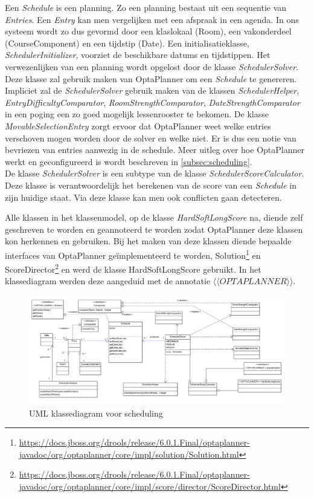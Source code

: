 Een \textit{Schedule} is een planning.
Zo een planning bestaat uit een sequentie van \textit{Entries}.
Een \textit{Entry} kan men vergelijken met een afspraak in een agenda.
In ons systeem wordt zo dus gevormd door een klaslokaal (Room), een vakonderdeel (CourseComponent) en een tijdstip (Date).
Een initialisatieklasse, \textit{SchedulerInitializer}, voorziet de beschikbare datums en tijdstippen.
Het verwezenlijken van een planning wordt opgelost door de klasse \textit{SchedulerSolver}.
Deze klasse zal gebruik maken van OptaPlanner om een \textit{ Schedule} te genereren.
Impliciet zal de \emph{SchedulerSolver} gebruik maken van de klassen \emph{SchedulerHelper}, \emph{EntryDifficultyComparator}, \emph{RoomStrengthComparator}, \emph{DateStrengthComparator} in een poging een zo goed mogelijk lessenrooster te bekomen.
De klasse \emph{MovableSelectionEntry} zorgt ervoor dat OptaPlanner weet welke entries verschoven mogen worden door de solver en welke niet.
Er is dus een notie van bevriezen van entries aanwezig in de schedule.
Meer uitleg over hoe OptaPlanner werkt en geconfigureerd is wordt beschreven in \ref{subsec:scheduling}.\\

De klasse \emph{SchedulerSolver} is een subtype van de klasse \emph{SchedulerScoreCalculator}.
Deze klasse is verantwoordelijk het berekenen van de score van een \emph{Schedule} in zijn huidige staat.
Via deze klasse kan men ook conflicten gaan detecteren.


Alle klassen in het klassenmodel, op de klasse \emph{HardSoftLongScore} na, diende zelf geschreven te worden en geannoteerd te worden zodat OptaPlanner deze klassen kon herkennen en gebruiken.
Bij het maken van deze klassen diende bepaalde interfaces van OptaPlanner ge\"{i}mplementeerd te worden, Solution\footnote{\url{https://docs.jboss.org/drools/release/6.0.1.Final/optaplanner-javadoc/org/optaplanner/core/impl/solution/Solution.html}} en ScoreDirector\footnote{\url{https://docs.jboss.org/drools/release/6.0.1.Final/optaplanner-javadoc/org/optaplanner/core/impl/score/director/ScoreDirector.html}} en werd de klasse HardSoftLongScore gebruikt.
In het klassediagram werden deze aangeduid met de annotatie \emph{$\langle\langle OPTAPLANNER\rangle\rangle$}.\\


\begin{landscape}
	\begin{figure}[H]
		\centering
		\includegraphics[scale=0.125]{img/scheduler}
		\caption{UML klassediagram voor scheduling}
		\label{fig:scheduling}
	\end{figure}
\end{landscape}

